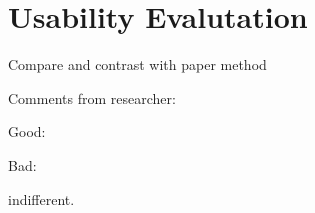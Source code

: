 \chapter{Usability Evalutation}

Compare and contrast with paper method



Comments from researcher:

Good:

Bad:


indifferent.
